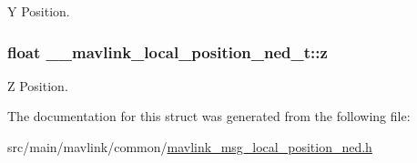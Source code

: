 Y Position. 

\hypertarget{struct____mavlink__local__position__ned__t_a4fc3fd6b6974b6b2356e4a7e28f9fecd}{
\subsubsection[{z}]{\setlength{\rightskip}{0pt plus 5cm}float \+\_\+\+\_\+mavlink\+\_\+local\+\_\+position\+\_\+ned\+\_\+t\+::z}}\label{struct____mavlink__local__position__ned__t_a4fc3fd6b6974b6b2356e4a7e28f9fecd}


Z Position. 



The documentation for this struct was generated from the following file\+:\begin{DoxyCompactItemize}
\item 
src/main/mavlink/common/\hyperlink{mavlink__msg__local__position__ned_8h}{mavlink\+\_\+msg\+\_\+local\+\_\+position\+\_\+ned.\+h}\end{DoxyCompactItemize}
